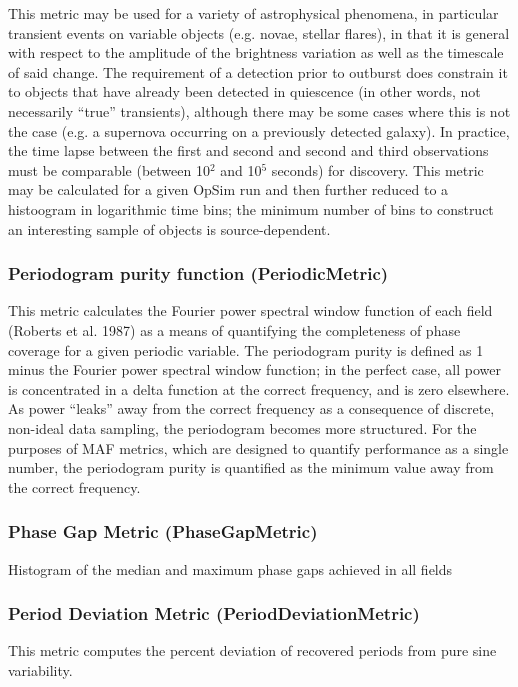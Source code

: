 This metric may be used for a variety of astrophysical phenomena, in particular transient events on variable objects (e.g. novae, stellar flares), in that it is general with respect to the amplitude of the brightness variation as well as the timescale of said change. The requirement of a detection prior to outburst does constrain it to objects that have already been detected in quiescence (in other words, not necessarily ``true'' transients), although there may be some cases where this is not the case (e.g. a supernova occurring on a previously detected galaxy). In practice, the time lapse between the first and second and second and third observations must be comparable (between 10$^2$ and 10$^5$ seconds) for discovery. This metric may be calculated for a given OpSim run and then further reduced to a histoogram in logarithmic time bins; the minimum number of bins to construct an interesting sample of objects is source-dependent. 

\subsubsection{Periodogram purity function (PeriodicMetric)}
This metric calculates the Fourier power spectral window function of each field (Roberts et al. 1987) as a means of quantifying the completeness of phase coverage for a given periodic variable. The periodogram purity is defined as 1 minus the Fourier power spectral window function; in the perfect case, all power is concentrated in a delta function at the correct frequency, and is zero elsewhere. As power ``leaks'' away from the correct frequency as a consequence of discrete, non-ideal data sampling, the periodogram becomes more structured. For the purposes of MAF metrics, which are designed to quantify performance as a single number, the periodogram purity is quantified as the minimum value away from the correct frequency. 

\subsubsection{Phase Gap Metric (PhaseGapMetric)}
Histogram of the median and maximum phase gaps achieved in all fields

\subsubsection{Period Deviation Metric (PeriodDeviationMetric)}

This metric computes the percent deviation of recovered periods from pure sine variability.

